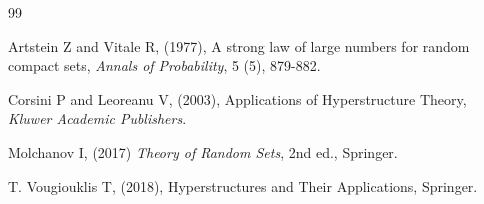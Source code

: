 \documentclass[twoside]{article}
\begin{document}
\begin{thebibliography}{99}

Artstein Z and Vitale R, (1977), 
A strong law of large numbers for random compact sets,
{\it Annals of Probability},
5 (5), 879-882.




Corsini P and  Leoreanu V, (2003),
Applications of Hyperstructure Theory,
{\it Kluwer Academic Publishers}.









Molchanov I, (2017)
{\it Theory of Random Sets},
2nd ed., Springer.


T. Vougiouklis T, (2018),
Hyperstructures and Their Applications,
Springer.

\end{thebibliography}
\end{document}
